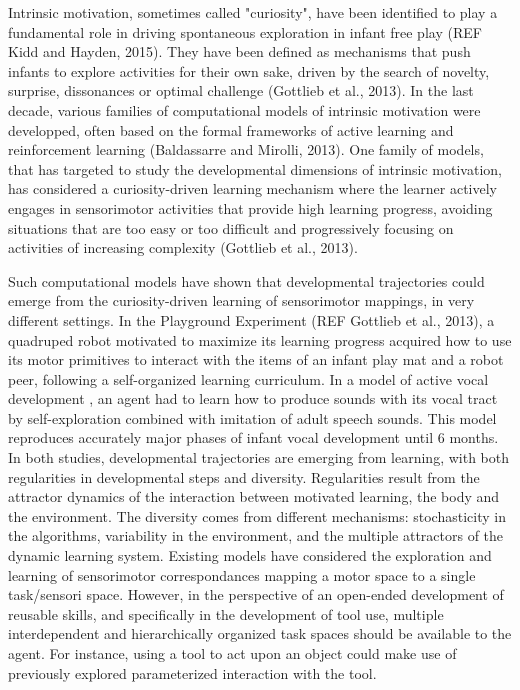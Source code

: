 \documentclass[10pt,letterpaper]{article}
\begin{document}
	Intrinsic motivation, sometimes called "curiosity", have been identified to play a fundamental role in driving spontaneous exploration in infant free play (REF Kidd and Hayden, 2015).
They have been defined as mechanisms that push infants to explore activities for their own sake, driven by the search of novelty, surprise, dissonances or optimal challenge (Gottlieb et al., 2013).
In the last decade, various families of computational models of intrinsic motivation were developped, often based on the formal frameworks of active learning and reinforcement learning (Baldassarre and Mirolli, 2013). One family of models, that has targeted to study the developmental dimensions of intrinsic motivation, has considered a curiosity-driven learning mechanism where
the learner actively engages in sensorimotor activities that provide high learning progress, avoiding situations that are too easy or too difficult and progressively focusing on activities of increasing complexity (Gottlieb et al., 2013). 

	Such computational models have shown that developmental trajectories could emerge from the curiosity-driven learning of sensorimotor mappings, in very different settings.
	In the Playground Experiment (REF Gottlieb et al., 2013), a quadruped robot motivated to maximize its learning progress acquired how to use its motor primitives to interact with the items of an infant play mat and a robot peer, following a self-organized learning curriculum.
	In a model of active vocal development \cite{moulin-frier_self-organization_2014}, an agent had to learn how to
	produce sounds with its vocal tract by self-exploration combined with imitation of adult speech sounds. 
	This model reproduces accurately major phases of infant vocal development until $6$ months.
	In both studies, developmental trajectories are emerging from learning, with both regularities in developmental steps and diversity. Regularities result from the attractor dynamics of the interaction between motivated learning, the body and the environment.
	The diversity comes from different mechanisms: stochasticity in the algorithms, variability in the environment, and the multiple attractors of the dynamic learning system.
	Existing models have considered the exploration and learning of sensorimotor correspondances mapping a motor space to a single task/sensori space. 
	However, in the perspective of an open-ended development of reusable skills, and specifically in the development of tool use, multiple interdependent and hierarchically organized task spaces should be available to the agent.
	For instance, using a tool to act upon an object could make use of previously explored parameterized interaction with the tool.
	
\end{document}
